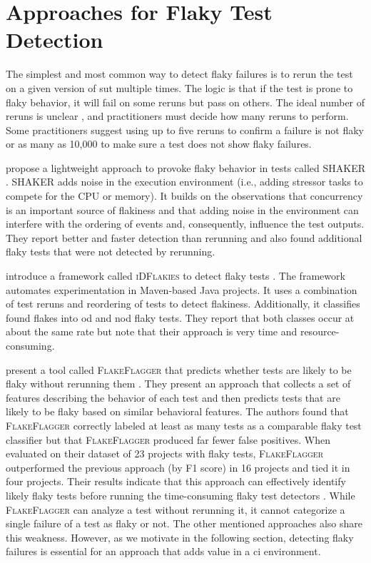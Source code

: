 \section{Approaches for Flaky Test Detection}
The simplest and most common way to detect flaky failures is to rerun the test on a given version of \ac{sut} multiple times.
The logic is that if the test is prone to flaky behavior, it will fail on some reruns but pass on others.
The ideal number of reruns is unclear \autocite{parry_survey_2021}, and practitioners must decide how many reruns to perform.
Some practitioners suggest using up to five reruns \autocite{lam_understanding_2020} to confirm a failure is not flaky or as many as 10,000 \autocite{alshammari_flakeflagger_2021} to make sure a test does not show flaky failures.

 propose a lightweight approach to provoke flaky behavior in tests called \textsc{SHAKER} \autocite{silva_shake_2020}.
\textsc{SHAKER} adds noise in the execution environment (i.e., adding stressor tasks to compete for the CPU or memory).
It builds on the observations that concurrency is an important source of flakiness and that adding noise in the environment can interfere with the ordering of events and, consequently, influence the test outputs.
They report better and faster detection than rerunning and also found additional flaky tests that were not detected by rerunning.

 introduce a framework called \textsc{iDFlakies} to detect flaky tests \autocite{lam_idflakies_2019}.
The framework automates experimentation in Maven-based Java projects.
It uses a combination of test reruns and reordering of tests to detect flakiness.
Additionally, it classifies found flakes into \ac{od} and \ac{nod} flaky tests.
They report that both classes occur at about the same rate but note that their approach is very time and resource-consuming.

 present a tool called \textsc{FlakeFlagger} that predicts whether tests are likely to be flaky without rerunning them \autocite{alshammari_flakeflagger_2021}.
They present an approach that collects a set of features describing the behavior of each test and then predicts tests that are likely to be flaky based on similar behavioral features.
The authors found that \textsc{FlakeFlagger} correctly labeled at least as many tests as a comparable flaky test classifier but that \textsc{FlakeFlagger} produced far fewer false positives.
When evaluated on their dataset of 23 projects with flaky tests, \textsc{FlakeFlagger} outperformed the previous approach (by F1 score) in 16 projects and tied it in four projects.
Their results indicate that this approach can effectively identify likely flaky tests before running the time-consuming flaky test detectors \autocite{alshammari_flakeflagger_2021}.
While \textsc{FlakeFlagger} can analyze a test without rerunning it, it cannot categorize a single failure of a test as flaky or not.
The other mentioned approaches also share this weakness.
However, as we motivate in the following section, detecting flaky failures is essential for an approach that adds value in a \ac{ci} environment.

